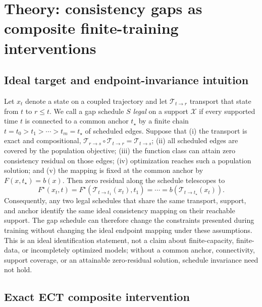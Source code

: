 
\section{Theory: consistency gaps as composite finite-training interventions}
\label{sec:theory}

\subsection{Ideal target and endpoint-invariance intuition}
\label{sec:theory-ideal-endpoint}

Let $x_t$ denote a state on a coupled trajectory and let
$\mathcal{T}_{t\rightarrow r}$ transport that state from $t$ to $r\leq t$.
We call a gap schedule $S$ \emph{legal} on a support $\mathcal{X}$ if every
supported time $t$ is connected to a common anchor $t_\star$ by a finite chain
$t=t_0>t_1>\cdots>t_m=t_\star$ of scheduled edges. Suppose that (i) the
transport is exact and compositional,
$\mathcal{T}_{r\rightarrow s}\!\circ\mathcal{T}_{t\rightarrow r}
=\mathcal{T}_{t\rightarrow s}$; (ii) all scheduled edges are covered by the
population objective; (iii) the function class can attain zero consistency
residual on those edges; (iv) optimization reaches such a population solution;
and (v) the mapping is fixed at the common anchor by
$F(x,t_\star)=b(x)$. Then zero residual along the schedule telescopes to
\begin{equation}
  F^\star(x_t,t)
  =F^\star\!\left(\mathcal{T}_{t\rightarrow t_1}(x_t),t_1\right)
  =\cdots
  =b\!\left(\mathcal{T}_{t\rightarrow t_\star}(x_t)\right).
  \label{eq:ideal-endpoint-invariance}
\end{equation}
Consequently, any two legal schedules that share the same transport, support,
and anchor identify the same ideal consistency mapping on their reachable
support. The gap schedule can therefore change the constraints presented during
training without changing the ideal endpoint mapping under these assumptions.
This is an ideal identification statement, not a claim about finite-capacity,
finite-data, or incompletely optimized models; without a common anchor,
connectivity, support coverage, or an attainable zero-residual solution,
schedule invariance need not hold.

\subsection{Exact ECT composite intervention}
\label{sec:theory-composite-intervention}

